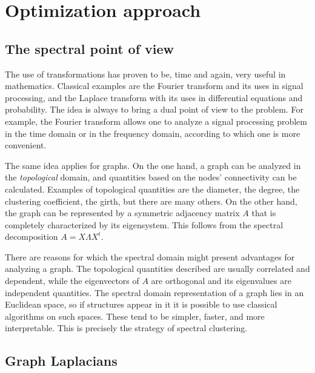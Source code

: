 \documentclass[../../main.tex]{subfiles} %
\begin{document}
\section{Optimization approach}  %
\subsection{The spectral point of view}  %
The use of transformations has proven to be, time and again, very useful in 
mathematics. Classical examples are the Fourier transform and its uses in 
signal processing, and the Laplace transform with its uses in differential 
equations and probability. The idea is always to bring a dual point of view to 
the problem. For example, the Fourier transform allows one to analyze a signal 
processing problem in the time domain or in the frequency domain, according 
to which one is more convenient.

The same idea applies for graphs. On the one hand, a graph can be analyzed in 
the \textit{topological} domain, and quantities based on the nodes' connectivity 
can be calculated. Examples of topological quantities are the diameter, the 
degree, the clustering coefficient, the girth, but there are many others. On the 
other hand, the graph can be represented by a symmetric adjacency matrix 
\(A\) that is completely characterized by its eigensystem. This follows from the 
spectral decomposition \(A = X \Lambda X^t\).

There are reasons for which the spectral domain might present advantages for 
analyzing a graph. The topological quantities described are usually correlated 
and dependent, while the eigenvectors of \(A\) are orthogonal and its 
eigenvalues are independent quantities. The spectral domain representation of 
a graph lies in an Euclidean space, so if structures appear in it it is possible to 
use classical algorithms on such spaces. These tend to be simpler, faster, and 
more interpretable. This is precisely the strategy of spectral clustering.

\subsection{Graph Laplacians}  %
\end{document}
